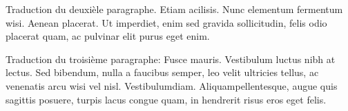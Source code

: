 \documentclass{book}
\begin{document}
\begin{pages}
\begin{Rightside}
 Traduction du deuxièle paragraphe. Etiam acilisis. Nunc elementum fermentum wisi. Aenean placerat. Ut imperdiet, enim sed gravida sollicitudin, felis odio placerat quam, ac pulvinar elit purus eget enim.  

Traduction du troisième paragraphe: Fusce mauris. Vestibulum luctus nibh at lectus. Sed bibendum, nulla a faucibus semper, leo velit ultricies tellus, ac venenatis arcu wisi vel nisl. Vestibulumdiam. Aliquampellentesque, augue quis sagittis posuere, turpis lacus congue quam, in hendrerit risus eros eget felis. 

\endnumbering
\end{Rightside}
\end{pages}
\Pages
\end{document}
